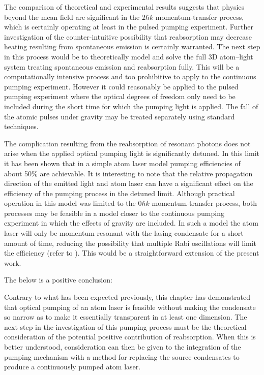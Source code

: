 The comparison of theoretical and experimental results suggests that physics beyond the mean field are significant in the $2 \hbar k$ momentum-transfer process, which is certainly operating at least in the pulsed pumping experiment.  Further investigation of the counter-intuitive possibility that reabsorption may decrease heating resulting from spontaneous emission is certainly warranted.  The next step in this process would be to theoretically model and solve the full 3D atom--light system treating spontaneous emission and reabsorption fully.  This will be a computationally intensive process and too prohibitive to apply to the continuous pumping experiment.  However it could reasonably be applied to the pulsed pumping experiment where the optical degrees of freedom only need to be included during the short time for which the pumping light is applied.  The fall of the atomic pulses under gravity may be treated separately using standard techniques.

The complication resulting from the reabsorption of resonant photons does not arise when the applied optical pumping light is significantly detuned.  In this limit it has been shown that in a simple atom laser model pumping efficiencies of about 50\% are achievable.  It is interesting to note that the relative propagation direction of the emitted light and atom laser can have a significant effect on the efficiency of the pumping process in the detuned limit.  Although practical operation in this model was limited to the $0 \hbar k$ momentum-transfer process, both processes may be feasible in a model closer to the continuous pumping experiment in which the effects of gravity are included.  In such a model the atom laser will only be momentum-resonant with the lasing condensate for a short amount of time, reducing the possibility that multiple Rabi oscillations will limit the efficiency (refer to ).  This would be a straightforward extension of the present work.


The below is a positive conclusion:

Contrary to what has been expected previously, this chapter has demonstrated that optical pumping of an atom laser is feasible without making the condensate so narrow as to make it essentially transparent in at least one dimension.  The next step in the investigation of this pumping process must be the theoretical consideration of the potential positive contribution of reabsorption.  When this is better understood, consideration can then be given to the integration of the pumping mechanism with a method for replacing the source condensates to produce a continuously pumped atom laser.


